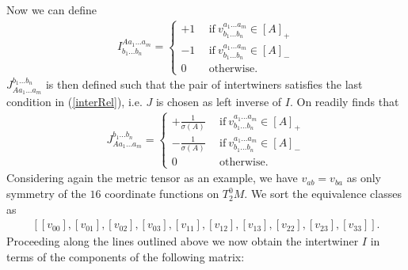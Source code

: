 \documentclass[a4paper,12pt, DIV=14, BCOR=5mm, twoside, headsepline, numbers=noenddot]{scrbook}
\begin{document}
Now we can define
\begin{align}\label{defI}
    I^{A a_1 ... a_m}_{b_1 ... b_n} = \begin{cases} 
        +1 \ \  &\text{if} \  v^{a_1 ... a_m}_{b_1 ... b_n} \in [A]_+ \\
        -1 \ \ &\text{if} \  v^{a_1 ... a_m}_{b_1 ... b_n} \in [A]_-  \\
        0 \ \   &\text{otherwise}. 
    \end{cases}
\end{align}
$J^{b_1 ... b_n}_{A a_1 ... a_m}$ is then defined such that the pair of intertwiners satisfies the last condition in (\ref{interRel}), i.e. $J$ is chosen as left inverse of $I$. On readily finds that
\begin{align}\label{defJ}
    J^{b_1 ... b_n}_{A a_1 ... a_m} = \begin{cases}  +\frac{1}{\sigma(A)} \ \ &\text{if} \  v^{a_1 ... a_m}_{b_1 ... b_n} \in [A]_+\\
    -\frac{1}{\sigma(A)} \ \  &\text{if} \  v^{a_1 ... a_m}_{b_1 ... b_n} \in [A]_- \\ 
    0   \ \ &\text{otherwise}.
    \end{cases}
\end{align}
Considering again the metric tensor as an example, we have $v_{ab} = v_{ba}$ as only symmetry of the $16$ coordinate functions on $T^0_2M$. We sort the equivalence classes as 
\begin{align}
    \left[[v_{00}], [v_{01}], [v_{02}], [v_{03}], [v_{11}], [v_{12}], [v_{13}], [v_{22}], [v_{23}], [v_{33}]\right ].
\end{align}
Proceeding along the lines outlined above we now obtain the intertwiner $I$ in terms of the components of the following matrix: 
\end{document}
